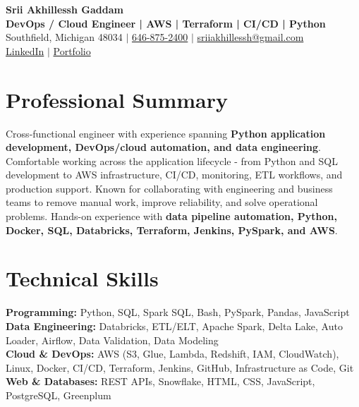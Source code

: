 \documentclass[letterpaper,10pt]{article}
\begin{document}
\fontsize{9.35pt}{10.45pt}\selectfont

\begin{center}
    {\LARGE \textbf{Srii Akhillessh Gaddam}} \\[-1pt]
    \textbf{DevOps / Cloud Engineer | AWS | Terraform | CI/CD | Python} \\[2pt]
    Southfield, Michigan 48034 $|$
    \href{tel:6468752400}{646-875-2400} $|$
    \href{mailto:sriiakhillessh@gmail.com}{sriiakhillessh@gmail.com} \\[1pt]
    \href{https://www.linkedin.com/in/srii-akhiilessh-gaddam-b48668191/}{LinkedIn} $|$
    \href{https://sriiakhillesshg.github.io/portfolio/}{Portfolio}
\end{center}
\vspace{-8pt}

\section{Professional Summary}
\small{Cross-functional engineer with experience spanning \textbf{Python application development, DevOps/cloud automation, and data engineering}. Comfortable working across the application lifecycle - from Python and SQL development to AWS infrastructure, CI/CD, monitoring, ETL workflows, and production support. Known for collaborating with engineering and business teams to remove manual work, improve reliability, and solve operational problems. Hands-on experience with \textbf{data pipeline automation, Python, Docker, SQL, Databricks, Terraform, Jenkins, PySpark, and AWS}.}

\section{Technical Skills}
\small{
\textbf{Programming:} Python, SQL, Spark SQL, Bash, PySpark, Pandas, JavaScript \\
\textbf{Data Engineering:} Databricks, ETL/ELT, Apache Spark, Delta Lake, Auto Loader, Airflow, Data Validation, Data Modeling \\
\textbf{Cloud \& DevOps:} AWS (S3, Glue, Lambda, Redshift, IAM, CloudWatch), Linux, Docker, CI/CD, Terraform, Jenkins, GitHub, Infrastructure as Code, Git \\
\textbf{Web \& Databases:} REST APIs, Snowflake, HTML, CSS, JavaScript, PostgreSQL, Greenplum
}
\end{document}
